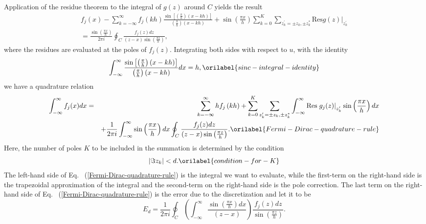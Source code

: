 \documentclass[aps,showkeys,noshowpacs,superscriptaddress,pre,preprint]{revtex4-2}
\let\label\orilabel
\begin{document}
Application of the residue theorem to the integral of ${g (z)}$ around $C$ yields the result
\begin{eqnarray*}
{f_j (x)} 
- \sum_{k = - \infty}^{\infty} {f_j ( k h )} \frac{\sin\left[ \left( \frac{\pi}{h}\right)  \left( x - k h \right) \right]}{
\left( \frac{\pi}{h} \right) \left( x - kh \right)}
+ \sin \left( \frac{\pi x}{h} \right) \sum_{k=0}^{K} 
\sum_{z_k^\prime = \pm z_k, \pm z_k^\ast} {\mathrm{Res} \left. g(z)\right\vert_{z_k^\prime} }
\\
= \frac{\sin \left( \frac{ \pi x}{h} \right)}{2 \pi i}
\oint_C \frac{f_j (z) dz}{\left( z - x \right) \sin \left( \frac{\pi z}{h} \right) } ,
\end{eqnarray*}
where the residues are evaluated at the poles of ${f_j (z)}$.
Integrating both sides with respect to $u$,
with the identity 
\begin{equation}
\int_{-\infty}^{\infty} \frac{\sin\left[ \left( \frac{\pi}{h}\right)  \left( x - k h \right) \right]}{
\left( \frac{\pi}{h} \right) \left( x - kh \right)} dx = h ,
\label{sinc-integral-identity}
\end{equation}
we have a quadrature relation
\begin{eqnarray}
\int_{-\infty}^{\infty} {f_j (x)} dx &=&
\sum_{k = - \infty}^{\infty} h {f_j \left( k h \right)}
+ \sum_{k = 0}^{K} \sum_{z_k^\prime = \pm z_k, \pm z_k^\ast}
\int_{-\infty}^{\infty}  {\mathrm{Res} \left. g_j (z)\right\vert_{z_k^\prime} } 
\sin\left( \frac{\pi x}{h} \right) dx
\nonumber \\
& &  + \frac{1}{2 \pi i} \int_{-\infty}^{\infty} \sin \left( \frac{\pi x}{h} \right) dx
\oint_C \frac{f_j (z) dz}{\left( z - x \right) \sin \left( \frac{\pi z}{h} \right) } .
\label{Fermi-Dirac-quadrature-rule}
\end{eqnarray}
Here, the number of poles $K$ to be included in the summation 
is determined by the condition
\begin{equation}
\left\vert \Im z_k \right\vert < d.
\label{condition-for-K}
\end{equation}
The left-hand side of Eq. ~(\ref{Fermi-Dirac-quadrature-rule}) 
is the integral we want to evaluate, while
the first-term on the right-hand side is the trapezoidal approximation of the integral and
the second-term on the right-hand side is the pole correction.
The last term on the right-hand side of Eq. ~(\ref{Fermi-Dirac-quadrature-rule}) 
is the error due to the discretization
and let it to be 
\begin{equation*}
E_d = \frac{1}{2 \pi i}  \oint_C \left( \int_{-\infty}^{\infty} 
\frac{\sin \left( \frac{\pi x}{h} \right) dx}{\left( z - x \right)} \right)
 \frac{f_j (z) dz}{ \sin \left( \frac{\pi z}{h} \right) } .
\end{equation*} 
\end{document}
